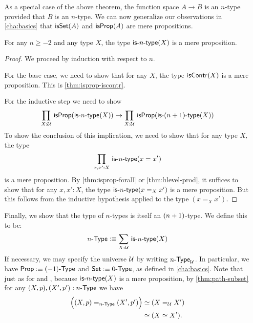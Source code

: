 As a special case of the above theorem, the function space $A \to B$ is an $n$-type provided that $B$ is an $n$-type.
We can now generalize our observations in \cref{cha:basics} that $\isset(A)$ and $\isprop(A)$ are mere propositions.

\begin{thm}\label{thm:isaprop-isofhlevel}
 For any $n \geq -2$ and any type $X$, the type $\istype{n}(X)$ is a mere proposition.
\end{thm}
\begin{proof}
  We proceed by induction with respect to $n$.

 For the base case, we need to show that for any $X$, the type $\iscontr(X)$ is a mere proposition.
 This is \cref{thm:isprop-iscontr}.

For the inductive step we need to show
\[\prd{X : \type} \isprop (\istype{n}(X)) \to \prd{X : \type} \isprop (\istype{\nplusone}(X)) \]
To show the conclusion of this implication, we need to show that for any type $X$, the type
\[\prd{x, x' : X}\istype{n}(x = x')\]
is a mere proposition. By \cref{thm:isprop-forall} or \cref{thm:hlevel-prod}, it suffices to show that for any $x, x' : X$, the type $\istype{n}(x =_X x')$ is a mere
proposition.
But this follows from the inductive hypothesis applied to the type $(x =_X x')$.
\end{proof}

Finally, we show that the type of $n$-types is itself an $\nplusone$-type.
We define this to be:
\[\ntype{n} \defeq \sm{X : \type} \istype{n}(X) \]
If necessary, we may specify the universe $\UU$ by writing $\ntypeU{n}$.
In particular, we have $\prop \defeq \ntype{(-1)}$ and $\set \defeq \ntype{0}$, as defined in \cref{cha:basics}.
Note that just as for \prop and \set, because $\istype{n}(X)$ is a mere proposition, by \cref{thm:path-subset} for any $(X,p), (X',p'):\ntype{n}$ we have
\begin{align*}
  \Big(\id[\ntype{n}]{(X, p)}{(X', p')}\Big) &\eqvsym (\id[\type] X X')\\
  &\eqvsym (\eqv{X}{X'}).
\end{align*}

